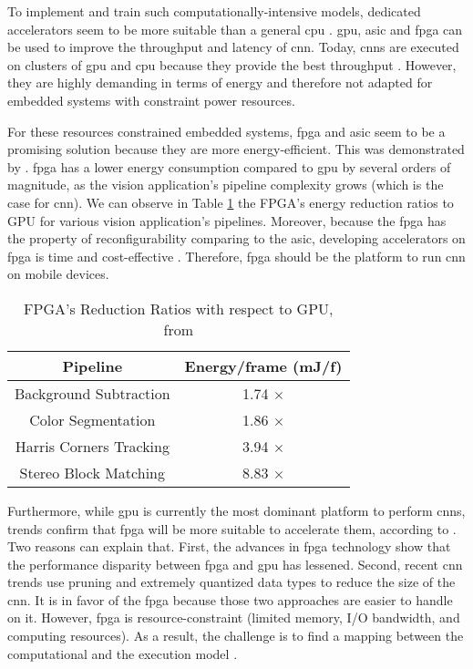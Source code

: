 To implement and train such computationally-intensive models, dedicated accelerators seem to be more suitable than a general \acrfull{cpu} \cite{liu_fpga-based_2019}. \acrfull{gpu}, \acrfull{asic} and \acrfull{fpga} can be used to improve the throughput and latency of \acrshort{cnn}. Today, \acrshort{cnn}s are executed on clusters of \acrshort{gpu} and \acrshort{cpu} because they provide the best throughput \cite{liu_uniform_2019}. However, they are highly demanding in terms of energy and therefore not adapted for embedded systems with constraint power resources.

For these resources constrained embedded systems, \acrshort{fpga} and \acrshort{asic} seem to be a promising solution because they are more energy-efficient. This was demonstrated by \textcite{qasaimeh_comparing_2019}. \acrshort{fpga} has a lower energy consumption compared to \acrshort{gpu} by several orders of magnitude, as the vision application’s pipeline complexity grows (which is the case for \acrshort{cnn}). We can observe in Table \ref{tab:benchener} the FPGA’s energy reduction ratios to GPU for various vision application’s pipelines. Moreover, because the \acrshort{fpga} has the property of reconfigurability comparing to the \acrshort{asic}, developing accelerators on \acrshort{fpga} is time and cost-effective \cite{motamedi_placid_2017}. Therefore, \acrshort{fpga} should be the platform to run \acrshort{cnn} on mobile devices.
%
\begin{table}[H]
    \center
    \begin{tabular}{|c|c|}
        \hline
        Pipeline & Energy/frame (mJ/f) \\
        \hline
        Background Subtraction & 1.74 $\times$\\
        \hline
        Color Segmentation & 1.86 $\times$ \\
        \hline
        Harris Corners Tracking & 3.94 $\times$ \\
        \hline
        Stereo Block Matching & 8.83 $\times$ \\
        \hline
    \end{tabular}
    \caption{FPGA’s Reduction Ratios with respect to GPU, from \cite{qasaimeh_comparing_2019}}
    \label{tab:benchener}
\end{table}

Furthermore, while \acrshort{gpu} is currently the most dominant platform to perform \acrshort{cnn}s, trends confirm that \acrshort{fpga} will be more suitable to accelerate them, according to \textcite{nurvitadhi_can_2017}. Two reasons can explain that. First, the advances in \acrshort{fpga} technology show that the performance disparity between \acrshort{fpga} and \acrshort{gpu} has lessened. Second, recent \acrshort{cnn} trends use pruning and extremely quantized data types to reduce the size of the \acrshort{cnn}. It is in favor of the \acrshort{fpga} because those two approaches are easier to handle on it. However, \acrshort{fpga} is resource-constraint (limited memory, I/O bandwidth, and computing resources). As a result, the challenge is to find a mapping between the computational and the execution model \cite{morcel_feathernet_2019}.

